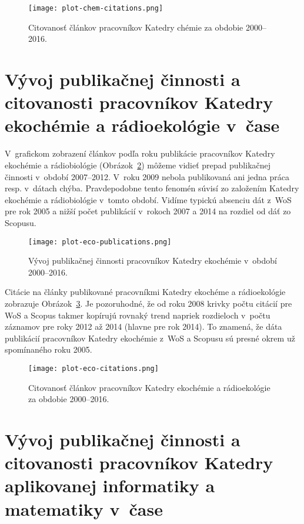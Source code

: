 \begin{figure}
  \centering
  \texttt{[image: plot-chem-citations.png]}
  \caption{Citovanosť článkov pracovníkov Katedry chémie za obdobie 2000--2016.}
  \label{fig:plot.chem.citations}
\end{figure}


\section{Vývoj publikačnej činnosti a citovanosti pracovníkov Katedry ekochémie
  a rádioekológie v~čase}

V~grafickom zobrazení článkov podľa roku publikácie pracovníkov Katedry
ekochémie a rádiobiológie (Obrázok~\ref{fig:plot.eco.publications}) môžeme vidieť
prepad publikačnej činnosti v~období 2007--2012.  V~roku 2009 nebola publikovaná
ani jedna práca resp. v~dátach chýba.  Pravdepodobne tento fenomén súvisí zo
založením Katedry ekochémie a rádiobiológie v~tomto období.  Vidíme typickú
absenciu dát z~WoS pre rok 2005 a nižší počet publikácií v~rokoch 2007 a 2014 na
rozdiel od dáť zo Scopusu.

\begin{figure}
  \centering
  \texttt{[image: plot-eco-publications.png]}
  \caption{Vývoj publikačnej činnosti pracovníkov Katedry ekochémie v~období
    2000--2016.}
  \label{fig:plot.eco.publications}
\end{figure}

Citácie na články publikované pracovníkmi Katedry ekochéme a rádioekológie
zobrazuje Obrázok~\ref{fig:plot.eco.citations}.  Je pozoruhodné, že od roku 2008
krivky počtu citácií pre WoS a Scopus takmer kopírujú rovnaký trend napriek
rozdieloch v~počtu záznamov pre roky 2012 až 2014 (hlavne pre rok 2014).  To
znamená, že dáta publikácií pracovníkov Katedry ekochémie z~WoS a Scopusu sú
presné okrem už spomínaného roku 2005.

\begin{figure}
  \centering
  \texttt{[image: plot-eco-citations.png]}
  \caption{Citovanosť článkov pracovníkov Katedry ekochémie a rádioekológie za
    obdobie 2000--2016.}
  \label{fig:plot.eco.citations}
\end{figure}


\section{Vývoj publikačnej činnosti a citovanosti pracovníkov Katedry
  aplikovanej informatiky a matematiky v~čase}


